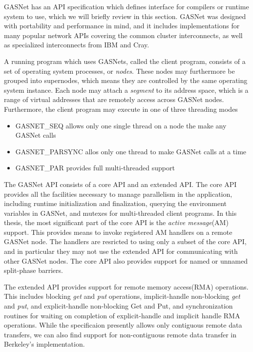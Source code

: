GASNet has an API specification which defines interface for compilers or runtime system to use, which we will briefly review in this section. GASNet was designed with portability and performance in mind, and it includes implementations for many popular network APIs covering the common cluster interconnects, as well as specialized interconnects from IBM and Cray. 

A running program which uses GASNets, called the client program, consists of a set of operating system processes, or \emph{nodes}. These nodes may furthermore be grouped into supernodes, which means they are controlled by the same operating system instance. Each node may attach a \emph{segment} to its address space, which is a range of virtual addresses that are remotely access across GASNet nodes. Furthermore, the client program may execute in one of three threading modes 
\begin{itemize}
\item GASNET\_SEQ allows only one single thread on a node the make any GASNet calls
\item GASNET\_PARSYNC allos only one thread to make GASNet calls at a time
\item GASNET\_PAR provides full multi-threaded support
\end{itemize}

The GASNet API consists of a core API and an extended API. The core API provides all the facilities necessary to manage parallelism in the application, including runtime initialization and finalization, querying the environment variables in GASNet, and mutexes for multi-threaded client programs. In this thesis, the most significant part of the core API is the \emph{active message}(AM) support. This provides means to invoke registered AM handlers on a remote GASNet node. The handlers are resricted to using only a subset of the core API, and in particular they may not use the extended API for communicating with other GASNet nodes. The core API also provides support for named or unnamed split-phase barriers. 

The extended API provides support for remote memory access(RMA) operations. This includes blocking \emph{get} and \emph{put} operations, implicit-handle non-blocking \emph{get} and \emph{put}, and explicit-handle non-blocking Get and Put, and synchronization routines for waiting on completion of explicit-handle and implicit handle RMA operations. While the specificaion presently allows only contiguous remote data transfers, we can also find support for non-contiguous remote data transfer in Berkeley's implementation. 


